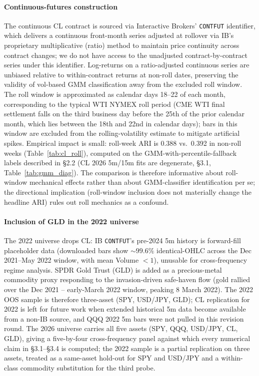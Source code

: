 \documentclass[preprint,12pt,authoryear]{elsarticle}
\newcommand{\CL}{CL}
\begin{document}
\paragraph{Continuous-futures construction}
The continuous CL contract is sourced via Interactive Brokers' \texttt{CONTFUT} identifier, which delivers a continuous front-month series adjusted at rollover via IB's proprietary multiplicative (ratio) method to maintain price continuity across contract changes; we do not have access to the unadjusted contract-by-contract series under this identifier. Log-returns on a ratio-adjusted continuous series are unbiased relative to within-contract returns at non-roll dates, preserving the validity of vol-based GMM classification away from the excluded roll window. The roll window is approximated as calendar days 18--22 of each month, corresponding to the typical WTI NYMEX roll period (CME WTI final settlement falls on the third business day before the 25th of the prior calendar month, which lies between the 18th and 22nd in calendar days); bars in this window are excluded from the rolling-volatility estimate to mitigate artificial spikes. Empirical impact is small: roll-week ARI is 0.388 vs.\ 0.392 in non-roll weeks (Table~\ref{tab:cl_roll}), computed on the GMM-with-percentile-fallback labels described in \S{}2.2 (CL 2026 5m/15m fits are degenerate, \S{}3.1, Table~\ref{tab:gmm_diag}). The comparison is therefore informative about roll-window mechanical effects rather than about GMM-classifier identification per se; the directional implication (roll-window inclusion does not materially change the headline ARI) rules out roll mechanics as a confound.
\paragraph{Inclusion of GLD in the 2022 universe}
The 2022 universe drops \CL{}: IB \texttt{CONTFUT}'s pre-2024 5m history is forward-fill placeholder data (downloaded bars show $\sim 99.6\%$ identical-OHLC across the Dec 2021--May 2022 window, with mean Volume $< 1$), unusable for cross-frequency regime analysis. SPDR Gold Trust (GLD) is added as a precious-metal commodity proxy responding to the invasion-driven safe-haven flow (gold rallied over the Dec 2021 -- early-March 2022 window, peaking 8 March 2022). The 2022 OOS sample is therefore three-asset (SPY, USD/JPY, GLD); CL replication for 2022 is left for future work when extended historical 5m data become available from a non-IB source, and QQQ 2022 5m bars were not pulled in this revision round. The 2026 universe carries all five assets (SPY, QQQ, USD/JPY, CL, GLD), giving a five-by-four cross-frequency panel against which every numerical claim in \S{}3.1--\S{}3.4 is computed; the 2022 sample is a partial replication on three assets, treated as a same-asset hold-out for SPY and USD/JPY and a within-class commodity substitution for the third probe.
\end{document}

